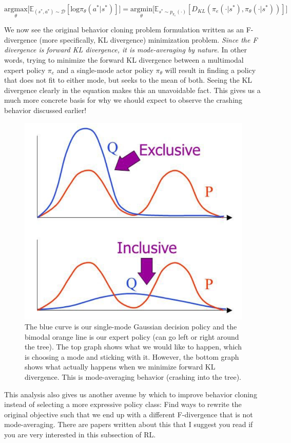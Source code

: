 \begin{flushleft}
    $$\underset{\theta}{\textrm{argmax}}\biggl[\mathbb{E}_{(s^{*},a^{*}) \sim \mathcal{D}}[\mathrm{log}\pi_\theta(a^{*}|s^{*})]\biggr] = \underset{\theta}{\textrm{argmin}}\biggl[\mathbb{E}_{s^{*} \sim p_{\pi_e}(\cdot)}[D_{KL}(\pi_e(\cdot|s^{*}),\pi_\theta(\cdot|s^{*}))]\biggr]$$

    We now see the original behavior cloning problem formulation written as an F-divergence (more specifically, KL divergence) minimization problem. \textit{Since the F divergence is forward KL divergence, it is mode-averaging by nature}. In other words, trying to minimize the forward KL divergence between a multimodal expert policy $\pi_e$ and a single-mode actor policy $\pi_\theta$ will result in finding a policy that does not fit to either mode, but seeks to the mean of both. Seeing the KL divergence clearly in the equation makes this an unavoidable fact. This gives us a much more concrete basis for why we should expect to observe the crashing behavior discussed earlier!

    \begin{figure}[H]
        \centering
        \includegraphics[width=0.7\linewidth]{rl/diffkl.png}
        \caption{The blue curve is our single-mode Gaussian decision policy and the bimodal orange line is our expert policy (can go left or right around the tree). The top graph shows what we would like to happen, which is choosing a mode and sticking with it. However, the bottom graph shows what actually happens when we minimize forward KL divergence. This is mode-averaging behavior (crashing into the tree).}
        \label{fig:diffkl}
    \end{figure}

    This analysis also gives us another avenue by which to improve behavior cloning instead of selecting a more expressive policy class: Find ways to rewrite the original objective such that we end up with a different F-divergence that is not mode-averaging. There are papers written about this that I suggest you read if you are very interested in this subsection of RL.
\end{flushleft}

